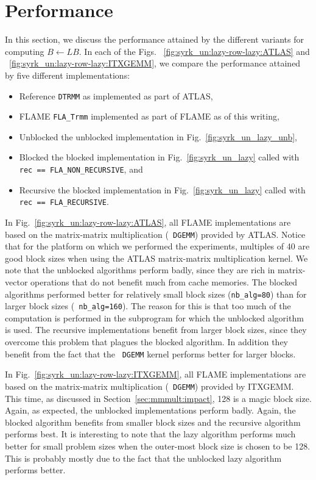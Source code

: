 \section{Performance}

In this section, we discuss the performance attained by the different
variants for computing $ B \leftarrow L B $.  In each of the Figs.
~\ref{fig:syrk_un:lazy-row-lazy:ATLAS} and
~\ref{fig:syrk_un:lazy-row-lazy:ITXGEMM}, we compare the performance
attained by five different implementations:
\begin{itemize}
\item{Reference}
{\tt DTRMM} as implemented as part of ATLAS,
\item{FLAME}
{\tt FLA\_Trmm} implemented as part of FLAME
as of this writing,
\item{Unblocked}
the unblocked implementation in Fig.~\ref{fig:syrk_un_lazy_unb},
\item{Blocked}
the blocked implementation in Fig.~\ref{fig:syrk_un_lazy}
called with 
{\tt rec == 
%
FLA\_NON\_RECURSIVE}, and
\item{Recursive}
the blocked implementation in Fig.~\ref{fig:syrk_un_lazy}
called with 
{\tt rec == 
%
FLA\_RECURSIVE}.
\end{itemize}
In Fig.~\ref{fig:syrk_un:lazy-row-lazy:ATLAS}, all FLAME
implementations are based on the matrix-matrix multiplication ({\tt
DGEMM}) provided by ATLAS.  Notice that for the platform on which we
performed the experiments, multiples of 40 are good block sizes when
using the ATLAS matrix-matrix multiplication kernel.  We note that the
unblocked algorithms perform badly, since they are rich in
matrix-vector operations that do not benefit much from cache memories.
The blocked algorithms performed better for relatively small block
sizes ({\tt nb\_alg=80}) than for larger block sizes ({\tt
nb\_alg=160}).  The reason for this is that too much of the
computation is performed in the subprogram for which the unblocked
algorithm is used.  The recursive implementations benefit from larger
block sizes, since they overcome this problem that plagues the blocked
algorithm.  In addition they benefit from the fact that the {\tt
DGEMM} kernel performs better for larger blocks.

In Fig.~\ref{fig:syrk_un:lazy-row-lazy:ITXGEMM}, all FLAME
implementations are based on the matrix-matrix multiplication ({\tt
DGEMM}) provided by ITXGEMM.  This time, as discussed in
Section~\ref{sec:mmmult:impact}, 128 is a magic block size.  Again, as
expected, the unblocked implementations perform badly.  Again, the
blocked algorithm benefits from smaller block sizes and the recursive
algorithm performs best.  It is interesting to note that the lazy
algorithm performs much better for small problem sizes when the
outer-most block size is chosen to be 128.  This is probably mostly
due to the fact that the unblocked lazy algorithm performs better.

